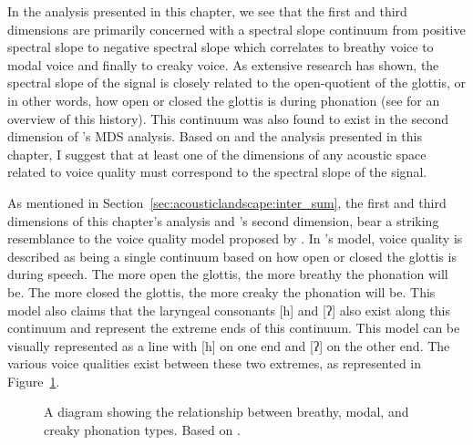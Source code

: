 In the analysis presented in this chapter, we see that the first and third dimensions are primarily concerned with a spectral slope continuum from positive spectral slope to negative spectral slope which correlates to breathy voice to modal voice and finally to creaky voice. As extensive research has shown, the spectral slope of the signal is closely related to the open-quotient of the glottis, or in other words, how open or closed the glottis is during phonation (see \citet{garellekTheoreticalAchievementsPhonetics2022} for an overview of this history). This continuum was also found to exist in the second dimension of \citeauthor{keatingCrosslanguageAcousticSpace2023}'s \citeyear{keatingCrosslanguageAcousticSpace2023} MDS analysis. Based on \citet{keatingCrosslanguageAcousticSpace2023} and the analysis presented in this chapter, I  suggest that at least one of the dimensions of any acoustic space related to voice quality must correspond to the spectral slope of the signal. 

As mentioned in Section~\ref{sec:acousticlandscape:inter_sum}, the first and third dimensions of this chapter's analysis and \citeauthor{keatingCrosslanguageAcousticSpace2023}'s second dimension, bear a striking resemblance to the voice quality model proposed by \citet{gordonPhonationTypesCrosslinguistic2001}. In \citeauthor{gordonPhonationTypesCrosslinguistic2001}'s model, voice quality is described as being a single continuum based on how open or closed the glottis is during speech. The more open the glottis, the more breathy the phonation will be. The more closed the glottis, the more creaky the phonation will be. This model also claims that the laryngeal consonants [h] and [ʔ] also exist along this continuum and represent the extreme ends of this continuum.  This model can be visually represented as a line with [h] on one end and [ʔ] on the other end. The various voice qualities exist between these two extremes, as represented in Figure~\ref{fig:phonation_types_1}.

\begin{figure}[h!]
    \centering
    \caption{A diagram showing the relationship between breathy, modal, and creaky phonation types. Based on \citet{gordonPhonationTypesCrosslinguistic2001}.}
    \label{fig:phonation_types_1}
\end{figure}

